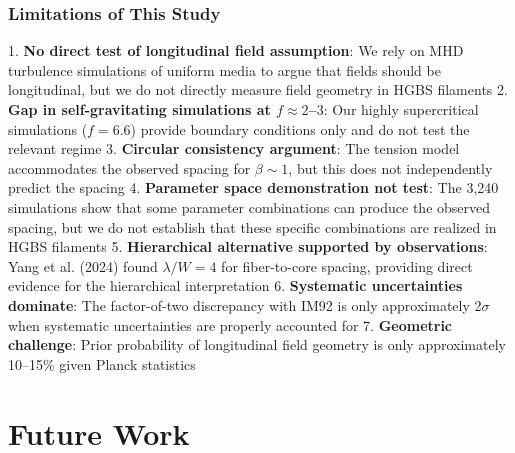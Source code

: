 \documentclass[11pt,a4paper]{article}
\begin{document}
\subsubsection{Limitations of This Study}

1. \textbf{No direct test of longitudinal field assumption}: We rely on MHD turbulence simulations of uniform media to argue that fields should be longitudinal, but we do not directly measure field geometry in HGBS filaments
2. \textbf{Gap in self-gravitating simulations at $f \approx 2$--$3$}: Our highly supercritical simulations ($f = 6.6$) provide boundary conditions only and do not test the relevant regime
3. \textbf{Circular consistency argument}: The tension model accommodates the observed spacing for $\beta \sim 1$, but this does not independently predict the spacing
4. \textbf{Parameter space demonstration not test}: The 3,240 simulations show that some parameter combinations can produce the observed spacing, but we do not establish that these specific combinations are realized in HGBS filaments
5. \textbf{Hierarchical alternative supported by observations}: Yang et al. (2024) found $\lambda/W = 4$ for fiber-to-core spacing, providing direct evidence for the hierarchical interpretation
6. \textbf{Systematic uncertainties dominate}: The factor-of-two discrepancy with IM92 is only approximately 2$\sigma$ when systematic uncertainties are properly accounted for
7. \textbf{Geometric challenge}: Prior probability of longitudinal field geometry is only approximately 10--15\% given Planck statistics

\section{Future Work}
\label{sec:future}
\end{document}
